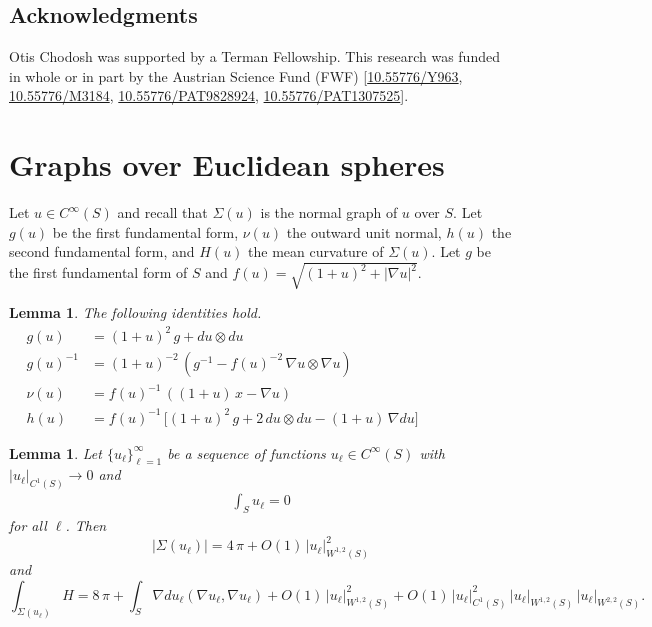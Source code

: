 \documentclass[11pt]{amsart}
\newtheorem{lemma}[theorem]{Lemma}
\theoremstyle {definition}
\begin{document}
\subsection*{Acknowledgments}
Otis Chodosh was supported by a Terman Fellowship. This research was  funded in whole or in part by the
Austrian Science Fund (FWF) [\href{https://www.fwf.ac.at/en/research-radar/10.55776/Y963}{10.55776/Y963}, \href{https://www.fwf.ac.at/en/research-radar/10.55776/M3184}{10.55776/M3184}, \href{https://www.fwf.ac.at/en/research-radar/10.55776/PAT9828924}{10.55776/PAT9828924}, 
\href{https://www.fwf.ac.at/en/research-radar/10.55776/PAT1307525}{10.55776/PAT1307525}].
\section{Graphs over Euclidean spheres}
Let $u\in C^\infty(S)$ and recall that $\Sigma(u)$ is the normal graph of $u$ over $S$.  Let $g(u)$ be the first fundamental form, $\nu(u)$ the outward unit normal, $h(u)$ the second fundamental form,  and $H(u)$  the mean curvature of $\Sigma(u)$. Let $g$ be the first fundamental form of $S$ and  $f(u)=\sqrt{(1+u)^2+|\nabla u|^2}$. 
\begin{lemma} The following identities hold. \label{graph identities} 
	\begin{align*} 
		 g(u)&=(1+u)^2\,g+du\otimes du\qquad\qquad\qquad\qquad\qquad\qquad\qquad\qquad\qquad\\
			g(u)^{-1}&=(1+u)^{-2}\,\left(g^{-1}-f(u)^{-2}\,\nabla u\otimes \nabla u\right)\\ 
		 \nu(u)&=f(u)^{-1}\,((1+u)\,x-\nabla u)\\
				h(u)&=f(u)^{-1}\,\big[(1+u)^2\,g+2\,du\otimes du-(1+u)\,\nabla d u\big]
	\end{align*}
\end{lemma} 
\begin{lemma} \label{expansion} Let $\{u_\ell\}_{\ell=1}^\infty$ be a sequence of functions $u_\ell\in C^\infty(S)$ with $|u_\ell|_{C^1(S)}\to0$  and
	\begin{align*} 
	\int_S u_\ell=0
	\end{align*} 
	for all $\ell$. Then
	$$
	|\Sigma(u_\ell)|=4\,\pi+O(1)\,|u_\ell|^2_{W^{1,2}(S)}
	$$
	and 
	$$
	\int_{\Sigma(u_\ell)}H=8\,\pi+\int_S \nabla du_\ell(\nabla u_\ell,\nabla u_\ell)+O(1)\,|u_\ell|^2_{W^{1,2}(S)}+O(1)\,|u_\ell|^2_{C^1(S)}\,|u_\ell|_{W^{1,2}(S)}\,|u_\ell|_{W^{2,2}(S)}.
	$$
\end{lemma} 
\end{document}

